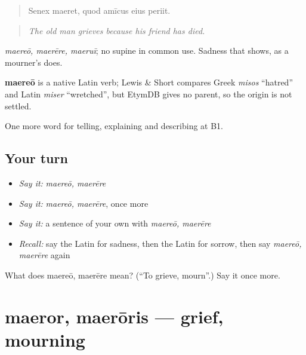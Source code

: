 \begin{quote}
Senex maeret, quod amīcus eius periit.
\end{quote}

\begin{quote}
\emph{The old man grieves because his friend has died.}
\end{quote}

\emph{maereō, maerēre, maeruī}; no supine in common use. Sadness that shows, as a mourner's does.

\begin{cousinweb}
\textbf{maereō} is a native Latin verb; Lewis \& Short compares Greek \emph{misos} \textquotedblleft{}hatred\textquotedblright{} and Latin \emph{miser} \textquotedblleft{}wretched\textquotedblright{}, but EtymDB gives no parent, so the origin is not settled.
\end{cousinweb}

\begin{grammarlens}[title={What you've built}]
One more word for telling, explaining and describing at B1.
\end{grammarlens}

\subsection*{Your turn}
\begin{itemize}
\raggedright
  \item \emph{Say it:} \emph{maereō, maerēre}
  \item \emph{Say it:} \emph{maereō, maerēre}, once more
  \item \emph{Say it:} a sentence of your own with \emph{maereō, maerēre}
  \item \emph{Recall:} say the Latin for sadness, then the Latin for sorrow, then say \emph{maereō, maerēre} again
\end{itemize}

\begin{tcolorbox}[breakable,colback=teal!4,colframe=teal!35!black,title={Before you move on}]
What does maereō, maerēre mean? (\textquotedblleft{}To grieve, mourn\textquotedblright{}.) Say it once more.
\end{tcolorbox}
\section[maeror, maerōris]{maeror, maerōris — grief, mourning}

\label{lesson:LA-C490-maeror}



